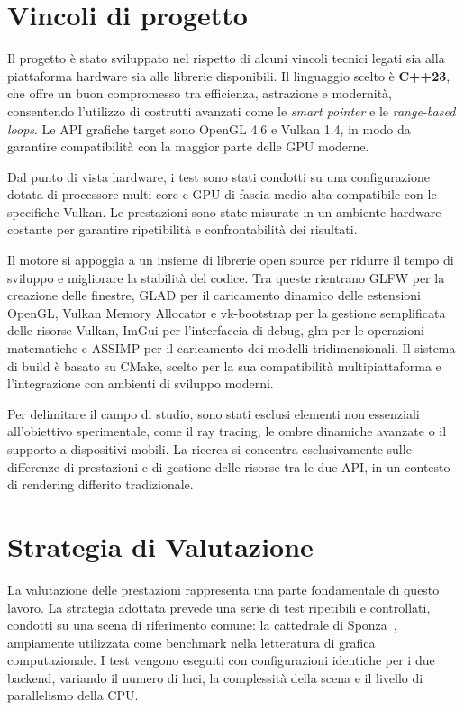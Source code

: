 \documentclass[12pt,a4paper,openright,twoside]{book}
\begin{document}
\section{Vincoli di progetto}
Il progetto è stato sviluppato nel rispetto di alcuni vincoli tecnici legati sia alla piattaforma hardware sia alle
librerie disponibili. Il linguaggio scelto è \textbf{C++23}, che offre un buon compromesso tra efficienza,
astrazione e modernità, consentendo l'utilizzo di costrutti avanzati come le \emph{smart pointer} e le
\emph{range-based loops}. Le API grafiche target sono OpenGL 4.6 e Vulkan 1.4, in modo da garantire compatibilità
con la maggior parte delle GPU moderne.

Dal punto di vista hardware, i test sono stati condotti su una configurazione dotata di processore multi-core e GPU
di fascia medio-alta compatibile con le specifiche Vulkan. Le prestazioni sono state misurate in un ambiente hardware
costante per garantire ripetibilità e confrontabilità dei risultati.

Il motore si appoggia a un insieme di librerie open source per ridurre il tempo di sviluppo e migliorare la stabilità
del codice. Tra queste rientrano GLFW per la creazione delle finestre, GLAD per il caricamento dinamico delle estensioni
OpenGL, Vulkan Memory Allocator e vk-bootstrap per la gestione semplificata delle risorse Vulkan, ImGui per
l'interfaccia di debug, glm per le operazioni matematiche e ASSIMP per il caricamento dei modelli tridimensionali.
Il sistema di build è basato su CMake, scelto per la sua compatibilità multipiattaforma e l'integrazione con ambienti
di sviluppo moderni.

Per delimitare il campo di studio, sono stati esclusi elementi non essenziali all'obiettivo sperimentale, come il
ray tracing, le ombre dinamiche avanzate o il supporto a dispositivi mobili. La ricerca si concentra esclusivamente
sulle differenze di prestazioni e di gestione delle risorse tra le due API, in un contesto di rendering differito
tradizionale.

\section{Strategia di Valutazione}
La valutazione delle prestazioni rappresenta una parte fondamentale di questo lavoro. La strategia adottata prevede
una serie di test ripetibili e controllati, condotti su una scena di riferimento comune: la cattedrale di
Sponza~\cite{sponza_original,sponza_intel2022}, ampiamente utilizzata come benchmark nella letteratura di grafica
computazionale. I test vengono eseguiti con configurazioni identiche per i due backend, variando il numero di luci,
la complessità della scena e il livello di parallelismo della CPU.
\end{document}
